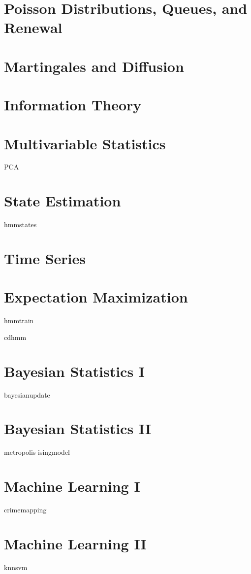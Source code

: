 \documentclass[nociteref]{newsiambook}
\begin{document}
\part{Poisson Distributions, Queues, and Renewal}

\part{Martingales and Diffusion}

\part{Information Theory}

\part{Multivariable Statistics}
{PCA}

\part{State Estimation}
{hmmstates}

\part{Time Series}

\part{Expectation Maximization}
{hmmtrain}

{cdhmm}

\part{Bayesian Statistics I}
{bayesianupdate}

\part{Bayesian Statistics II}
{metropolis}
{isingmodel}

\part{Machine Learning I}



{crimemapping}

\part{Machine Learning II}
{knnsvm}
\end{document}
